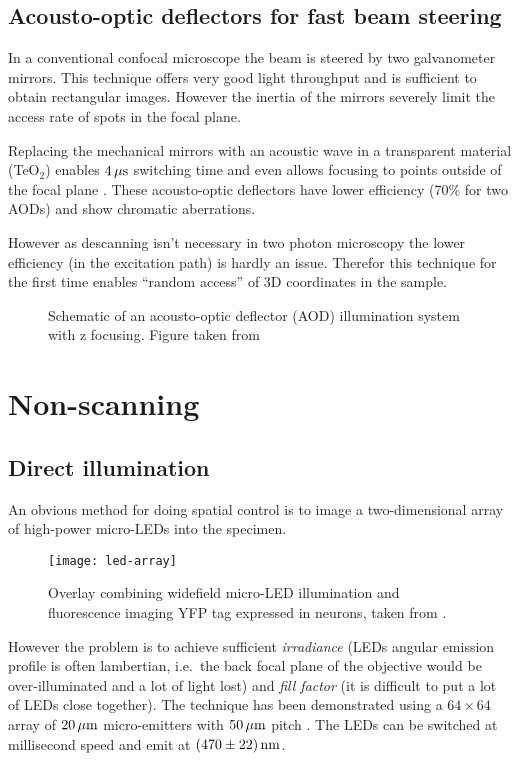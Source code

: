 \subsection{Acousto-optic deflectors for fast beam steering}
In a conventional confocal microscope the beam is steered by two
galvanometer mirrors. This technique offers very good light throughput
and is sufficient to obtain rectangular images. However the inertia of
the mirrors severely limit the access rate of spots in the focal
plane.

Replacing the mechanical mirrors with an acoustic wave in a
transparent material (TeO$_2$) enables $\unit[4]{\mu s}$ switching
time \citep{Otsu2008} and even allows focusing to points outside of
the focal plane \citep{Reddy2008}. These acousto-optic deflectors have
lower efficiency (70\% for two AODs) and show chromatic aberrations.

However as descanning isn't necessary in two photon microscopy the
lower efficiency (in the excitation path) is hardly an issue. Therefor
this technique for the first time enables ``random access'' of 3D
coordinates in the sample.

\begin{figure}[!hbt]
  \centering
  \caption{Schematic of an acousto-optic deflector (AOD) illumination
    system with z focusing. Figure taken from \citep{Reddy2008}}
  \label{fig:aod}
\end{figure}


\section{Non-scanning}
\subsection{Direct illumination}
An obvious method for doing spatial control is to image a
two-dimensional array of high-power micro-LEDs into the specimen.
\begin{figure}[!hbt]
  \centering
  \texttt{[image: led-array]} 
  \caption{Overlay combining widefield micro-LED illumination and
    fluorescence imaging YFP tag expressed in neurons, taken from
    \citep{grossman2010}.}
  \label{fig:led-array}
\end{figure}
However the problem is to achieve sufficient \emph{irradiance} (LEDs
angular emission profile is often lambertian, i.e.\ the back focal
plane of the objective would be over-illuminated and a lot of light
lost) and \emph{fill factor} (it is difficult to put a lot of LEDs
close together). The technique has been demonstrated using a
$64\times64$ array of $\unit[20]{\mu m}$ micro-emitters with
$\unit[50]{\mu m}$ pitch \citep{grossman2010}.  The LEDs can be
switched at millisecond speed and emit at $\unit[(470\pm22)]{nm}$.

